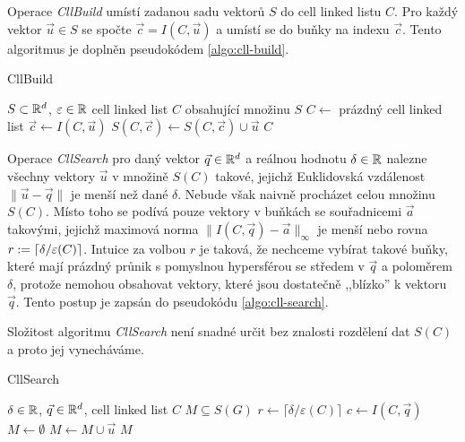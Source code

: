 Operace \textit{CllBuild} umístí zadanou sadu vektorů $S$ do cell linked listu $C$. Pro každý vektor $\vec{u} \in S$ se spočte $\vec{c} = I(C, \vec{u})$ a umístí se do buňky na indexu $\vec{c}$. Tento algoritmus je doplněn pseudokódem \ref{algo:cll-build}.

\begin{algorithm}[h!]
  \caption{CllBuild}
  \label{algo:cll-build}
  \begin{algorithmic}
    \REQUIRE $S \subset \mathbb{R}^d$, $\varepsilon \in \mathbb{R}$
    \ENSURE cell linked list $C$ obsahující množinu $S$
    \STATE $C \leftarrow$ prázdný cell linked list
      \STATE $\vec{c} \leftarrow I(C, \vec{u})$
      \STATE $S(C, \vec{c}) \leftarrow S(C, \vec{c}) \cup \vec{u}$
    \ENDFOR
    \RETURN $C$
  \end{algorithmic}
\end{algorithm}

Operace \textit{CllSearch} pro daný vektor $\vec{q} \in \mathbb{R}^d$ a reálnou hodnotu $\delta \in \mathbb{R}$ nalezne všechny vektory $\vec{u}$ v množině $S(C)$ takové, jejichž Euklidovská vzdálenost $\|\vec{u} - \vec{q}\|$ je menší než dané $\delta$. Nebude však naivně procházet celou množinu $S(C)$. Místo toho se podívá pouze vektory v buňkách se souřadnicemi $\vec{a}$ takovými, jejichž maximová norma $\|I(C, \vec{q}) - \vec{a}\|_\infty$ je menší nebo rovna $r := \lceil\delta / \varepsilon(C)\rceil$. Intuice za volbou $r$ je taková, že nechceme vybírat takové buňky, které mají prázdný průnik s pomyslnou hypersférou se středem v $\vec{q}$ a poloměrem $\delta$, protože nemohou obsahovat vektory, které jsou dostatečně ,,blízko'' k vektoru $\vec{q}$. Tento postup je zapsán do pseudokódu \ref{algo:cll-search}.

Složitost algoritmu \textit{CllSearch} není snadné určit bez znalosti rozdělení dat $S(C)$ a proto jej vynecháváme.

\begin{algorithm}[h!]
  \caption{CllSearch}
  \label{algo:cll-search}
  \begin{algorithmic}
    \REQUIRE $\delta \in \mathbb{R}$, $\vec{q} \in \mathbb{R}^d$, cell linked list $C$
    \ENSURE $M \subseteq S(G)$
    \STATE $r \leftarrow \lceil\delta / \varepsilon(C)\rceil$
    \STATE $c \leftarrow I(C, \vec{q})$
    \STATE $M \leftarrow \emptyset$
        \STATE $M \leftarrow M \cup \vec{u}$
      \ENDFOR
    \ENDFOR
    \RETURN $M$
  \end{algorithmic}
\end{algorithm}

